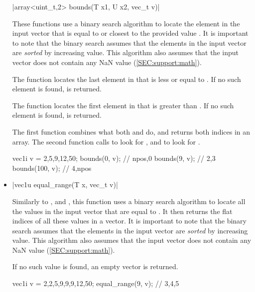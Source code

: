 \documentclass[12pt]{report}
\newenvironment{example}
{
    \begin{mdframed}[style=example,frametitle={Example}]
}
{
    \end{mdframed}
}
\begin{document}
\begin{itemize}
\cppinline|array<uint_t,2> bounds(T x1, U x2, vec_t v)|

These functions use a binary search algorithm to locate the element in the input vector  that is equal to or closest to the provided value . It is important to note that the binary search assumes that the elements in the input vector are \emph{sorted} by increasing value. This algorithm also assumes that the input vector does not contain any NaN value (\ref{SEC:support:math}).

The  function locates the last element in  that is less or equal to . If no such element is found,  is returned.

The  function locates the first element in  that is greater than . If no such element is found,  is returned.

The first  function combines what both  and  do, and returns both indices in an array. The second  function calls  to look for , and  to look for .

\begin{example}
\begin{cppcode}
vec1i v = {2,5,9,12,50};
bounds(0, v);   // {npos,0}
bounds(9, v);   // {2,3}
bounds(100, v); // {4,npos}
\end{cppcode}
\end{example}

\item \cppinline|vec1u equal_range(T x, vec_t v)| 

Similarly to ,  and , this function uses a binary search algorithm to locate all the values in the input vector  that are equal to . It then returns the flat indices of all these values in a vector. It is important to note that the binary search assumes that the elements in the input vector are \emph{sorted} by increasing value. This algorithm also assumes that the input vector does not contain any NaN value (\ref{SEC:support:math}).

If no such value is found, an empty vector is returned.

\begin{example}
\begin{cppcode}
vec1i v = {2,2,5,9,9,9,12,50};
equal_range(9, v); // {3,4,5}


\end{cppcode}
\end{example}
\end{itemize}
\end{document}
